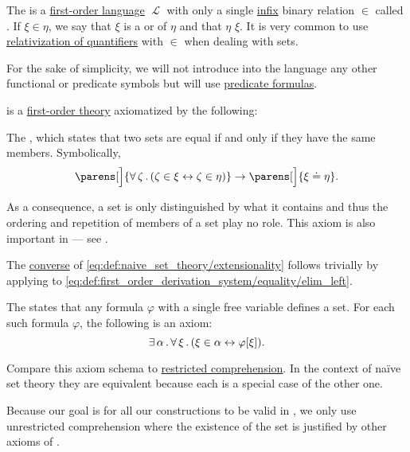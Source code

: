 \begin{definition}\label{def:naive_set_theory}
  The  is a \hyperref[def:first_order_syntax]{first-order language} \( \mscrL \) with only a single \hyperref[rem:first_order_formula_conventions/infix]{infix} binary relation \( \in \) called . If \( \xi \in \eta \), we say that \( \xi \) is a  or  of \( \eta \) and that \( \eta \)  \( \xi \). It is very common to use \hyperref[rem:first_order_formula_conventions/relativization]{relativization of quantifiers} with \( \in \) when dealing with sets.

  For the sake of simplicity, we will not introduce into the language any other functional or predicate symbols but will use \hyperref[rem:predicate_formula]{predicate formulas}.

   is a \hyperref[def:first_order_theory]{first-order theory} axiomatized by the following:
  \begin{thmenum}
     The , which states that two sets are equal if and only if they have the same members. Symbolically,
    \begin{equation}\label{eq:def:naive_set_theory/extensionality}
      \parens[\Big]{ \qforall \zeta (\zeta \in \xi \leftrightarrow \zeta \in \eta) } \rightarrow \parens[\Big]{ \xi \doteq \eta }.
    \end{equation}

    As a consequence, a set is only distinguished by what it contains and thus the ordering and repetition of members of a set play no role. This axiom is also important in  --- see .

    The \hyperref[def:material_implication/converse]{converse} of \eqref{eq:def:naive_set_theory/extensionality} follows trivially by applying  to \eqref{eq:def:first_order_derivation_system/equality/elim_left}.

     The  states that any formula \( \varphi \) with a single free variable defines a set. For each such formula \( \varphi \), the following is an axiom:
    \begin{equation}\label{eq:def:naive_set_theory/unrestricted_comprehension}
      \exists \thinspace \alpha \thinspace . \thinspace \forall \thinspace \xi \thinspace . \thinspace (\xi \in \alpha \leftrightarrow \varphi[\xi]).
    \end{equation}

    Compare this axiom schema to \hyperref[def:zfc/specification]{restricted comprehension}. In the context of na\"ive set theory they are equivalent because each is a special case of the other one.

    Because our goal is for all our constructions to be valid in \hyperref[def:zfc]{}, we only use unrestricted comprehension where the existence of the set is justified by other axioms of .
  \end{thmenum}
\end{definition}

